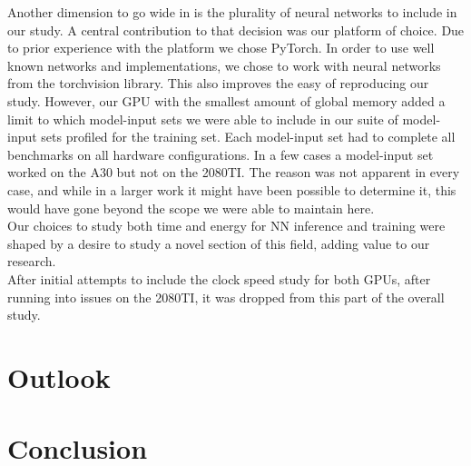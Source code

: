 Another dimension to go wide in is the plurality of neural networks to include in our study. A central contribution to that decision was our platform of choice. Due to prior experience with the platform we chose PyTorch. In order to use well known networks and implementations, we chose to work with neural networks from the torchvision library. This also improves the easy of reproducing our study. However, our GPU with the smallest amount of global memory added a limit to which model-input sets we were able to include in our suite of model-input sets profiled for the training set. Each model-input set had to complete all benchmarks on all hardware configurations. In a few cases a model-input set worked on the A30 but not on the 2080TI. The reason was not apparent in every case, and while in a larger work it might have been possible to determine it, this would have gone beyond the scope we were able to maintain here. \\
Our choices to study both time and energy for NN inference and training were shaped by a desire to study a novel section of this field, adding value to our research.  \\
After initial attempts to include the clock speed study for both GPUs, after running into issues on the 2080TI, it was dropped from this part of the overall study.



\section{Outlook}

\section{Conclusion}
